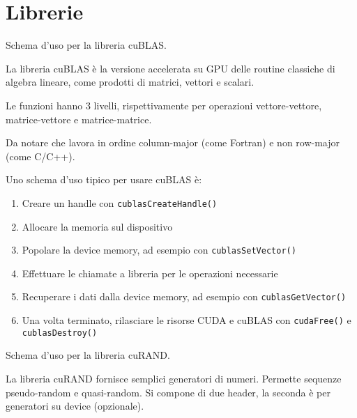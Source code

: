 \section{Librerie}

\begin{questions}
    \question Schema d'uso per la libreria cuBLAS.
    
    \begin{solution}
        La libreria cuBLAS è la versione accelerata su GPU delle routine classiche di algebra lineare, come prodotti di matrici, vettori e scalari.
        
        Le funzioni hanno 3 livelli, rispettivamente per operazioni vettore-vettore, matrice-vettore e matrice-matrice.
        
        Da notare che lavora in ordine column-major (come Fortran) e non row-major (come C/C++).
        
        Uno schema d'uso tipico per usare cuBLAS è:
        \begin{enumerate}
            \item Creare un handle con \texttt{cublasCreateHandle()}
            
            \item Allocare la memoria sul dispositivo
            
            \item Popolare la device memory, ad esempio con \texttt{cublasSetVector()}
            
            \item Effettuare le chiamate a libreria per le operazioni necessarie
            
            \item Recuperare i dati dalla device memory, ad esempio con \texttt{cublasGetVector()}
            
            \item Una volta terminato, rilasciare le risorse CUDA e cuBLAS con \texttt{cudaFree()} e \texttt{cublasDestroy()}
        \end{enumerate}
    \end{solution}
    
    \question Schema d'uso per la libreria cuRAND.
    
    \begin{solution}
        La libreria cuRAND fornisce semplici generatori di numeri. Permette sequenze pseudo-random e quasi-random. Si compone di due header, la seconda è per generatori su device (opzionale).
        

\end{solution}
\end{questions}
